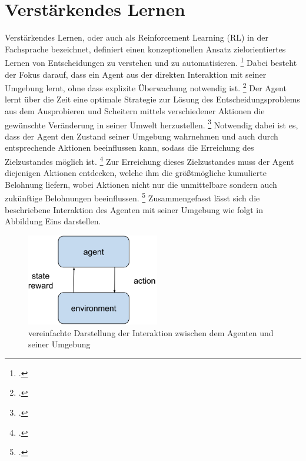 \section{Verstärkendes Lernen}
Verstärkendes Lernen, oder auch als Reinforcement Learning (RL) in der Fachsprache bezeichnet, definiert einen konzeptionellen Ansatz zielorientiertes Lernen von Entscheidungen zu verstehen und zu automatisieren. \footcite[Vgl.][S. 13]{Sutton.2018}
Dabei besteht der Fokus darauf, dass ein Agent aus der direkten Interaktion mit seiner Umgebung lernt, ohne dass explizite Überwachung notwendig ist. \footcite[Vgl.][S. 13]{Sutton.2018}
Der Agent lernt über die Zeit eine optimale Strategie zur Lösung des Entscheidungsproblems aus dem Ausprobieren und Scheitern mittels verschiedener Aktionen die gewünschte Veränderung in seiner Umwelt herzustellen. \footcite[Vgl.][S. 4]{Li.2019}
Notwendig dabei ist es, dass der Agent den Zustand seiner Umgebung wahrnehmen und auch durch entsprechende Aktionen beeinflussen kann, sodass die Erreichung des Zielzustandes möglich ist. \footcite[Vgl.][S. 2]{Sutton.2018}
Zur Erreichung dieses Zielzustandes muss der Agent diejenigen Aktionen entdecken, welche ihm die größtmögliche kumulierte Belohnung liefern, wobei Aktionen nicht nur die unmittelbare sondern auch zukünftige Belohnungen beeinflussen. \footcite[Vgl.][S. 1]{Sutton.2018}
Zusammengefasst lässt sich die beschriebene Interaktion des Agenten mit seiner Umgebung wie folgt in Abbildung Eins darstellen.
\begin{figure}[htb]
    \centering
    \includegraphics[height=4cm]{lib/graphics/Agent-Environment interaction.png}
    \caption[vereinfachte Darstellung der Interaktion zwischen dem Agenten und seiner Umgebung]{vereinfachte Darstellung der Interaktion zwischen dem Agenten und seiner Umgebung\footnotemark}
    \label{abb:Agent-Environment interaction}
\end{figure}


